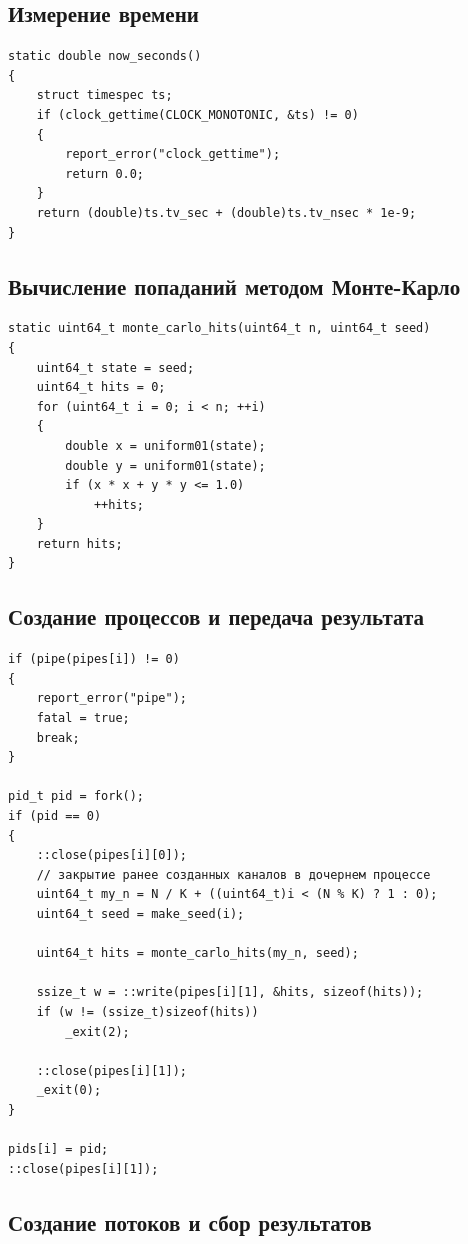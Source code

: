 \subsection*{Измерение времени}

\begin{lstlisting}
static double now_seconds()
{
    struct timespec ts;
    if (clock_gettime(CLOCK_MONOTONIC, &ts) != 0)
    {
        report_error("clock_gettime");
        return 0.0;
    }
    return (double)ts.tv_sec + (double)ts.tv_nsec * 1e-9;
}
\end{lstlisting}

\subsection*{Вычисление попаданий методом Монте-Карло}

\begin{lstlisting}
static uint64_t monte_carlo_hits(uint64_t n, uint64_t seed)
{
    uint64_t state = seed;
    uint64_t hits = 0;
    for (uint64_t i = 0; i < n; ++i)
    {
        double x = uniform01(state);
        double y = uniform01(state);
        if (x * x + y * y <= 1.0)
            ++hits;
    }
    return hits;
}
\end{lstlisting}

\subsection*{Создание процессов и передача результата}

\begin{lstlisting}
if (pipe(pipes[i]) != 0)
{
    report_error("pipe");
    fatal = true;
    break;
}

pid_t pid = fork();
if (pid == 0)
{
    ::close(pipes[i][0]);
    // закрытие ранее созданных каналов в дочернем процессе
    uint64_t my_n = N / K + ((uint64_t)i < (N % K) ? 1 : 0);
    uint64_t seed = make_seed(i);

    uint64_t hits = monte_carlo_hits(my_n, seed);

    ssize_t w = ::write(pipes[i][1], &hits, sizeof(hits));
    if (w != (ssize_t)sizeof(hits))
        _exit(2);

    ::close(pipes[i][1]);
    _exit(0);
}

pids[i] = pid;
::close(pipes[i][1]);
\end{lstlisting}

\subsection*{Создание потоков и сбор результатов}

